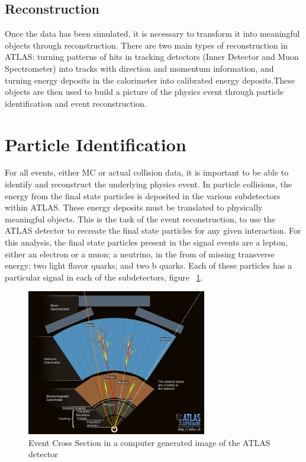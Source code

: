 \subsection{Reconstruction}
Once the data has been simulated, it is necessary to transform it into meaningful objects through reconstruction. There are two main types of reconstruction in ATLAS: turning patterns of hits in tracking detectors (Inner Detector and Muon Spectrometer) into tracks with direction and momentum information, and turning energy deposits in the calorimeter into calibrated energy deposits.These objects are then used to build a picture of the physics event through particle identification and event reconstruction. 
\section{Particle Identification}
For all events, either MC or actual collision data, it is important to be able to identify and reconstruct the underlying physics event. In particle collisions, the energy from the final state particles is deposited in the various subdetectors within ATLAS. These energy deposits must be translated to physically meaningful objects. This is the task of the event reconstruction, to use the ATLAS detector to recreate the final state particles for any given interaction. For this analysis, the final state particles present in the signal events are a lepton, either an electron or a muon; a neutrino, in the from of missing transverse energy; two light flavor quarks; and two b quarks. Each of these particles has a particular signal in each of the subdetectors, figure ~\ref{fig:crossSec}.

\begin{figure}[h]
\begin{center}
\includegraphics*[width=0.70\textwidth] {figures/layers}
\caption[Cartoon showing particle interating in ATLAS detector subsystems]{Event Cross Section in a computer generated image of the ATLAS detector \cite{Pequenao:1096081}}
\label{fig:crossSec}
\end{center}
\end{figure}



